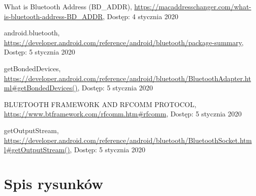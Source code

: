 \documentclass[a4paper,12pt, twoside]{article}
\begin{document}
\begin{thebibliography}{}
    		What is Bluetooth Address (BD\_ADDR),
    		\newline\url{https://macaddresschanger.com/what-is-bluetooth-address-BD_ADDR}, 
    		\newline Dostęp: 4 stycznia 2020
    		
    		android.bluetooth,
    		\newline\url{https://developer.android.com/reference/android/bluetooth/package-summary}, 
    		\newline Dostęp: 5 stycznia 2020
    		
    		getBondedDevices,
    		\newline\url{https://developer.android.com/reference/android/bluetooth/BluetoothAdapter.html#getBondedDevices()}, 
    		\newline Dostęp: 5 stycznia 2020
    		
    		BLUETOOTH FRAMEWORK AND RFCOMM PROTOCOL,
    		\newline\url{https://www.btframework.com/rfcomm.htm#rfcomm}, 
    		\newline Dostęp: 5 stycznia 2020
    		
    		getOutputStream,
    		\newline\url{https://developer.android.com/reference/android/bluetooth/BluetoothSocket.html#getOutputStream()}, 
    		\newline Dostęp: 5 stycznia 2020
    		
    	\end{thebibliography}
    	\endgroup
    	
    	\newpage
    	\section{Spis rysunków}
    	\begingroup
    	\renewcommand{\section}[2]{}%
    	\listoffigures
    	\endgroup
    	
    	\newpage
    	\section{Spis algorytmów}
    	\begingroup
    	\renewcommand{\section}[2]{}%
    	\lstlistoflistings
    	\renewcommand{\section}[2]{}%
    	\endgroup
    	
    
\end{document}
